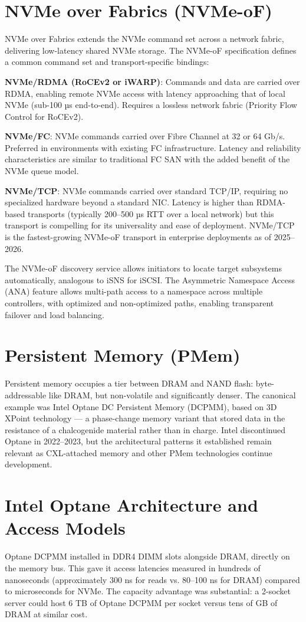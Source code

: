 \section{NVMe over Fabrics (NVMe-oF)}
NVMe over Fabrics extends the NVMe command set across a network fabric, delivering low-latency shared NVMe storage. The NVMe-oF specification defines a common command set and transport-specific bindings:

\textbf{NVMe/RDMA (RoCEv2 or iWARP)}: Commands and data are carried over RDMA, enabling remote NVMe access with latency approaching that of local NVMe (sub-100 µs end-to-end). Requires a lossless network fabric (Priority Flow Control for RoCEv2).

\textbf{NVMe/FC}: NVMe commands carried over Fibre Channel at 32 or 64 Gb/s. Preferred in environments with existing FC infrastructure. Latency and reliability characteristics are similar to traditional FC SAN with the added benefit of the NVMe queue model.

\textbf{NVMe/TCP}: NVMe commands carried over standard TCP/IP, requiring no specialized hardware beyond a standard NIC. Latency is higher than RDMA-based transports (typically 200--500 µs RTT over a local network) but this transport is compelling for its universality and ease of deployment. NVMe/TCP is the fastest-growing NVMe-oF transport in enterprise deployments as of 2025--2026.

The NVMe-oF discovery service allows initiators to locate target subsystems automatically, analogous to iSNS for iSCSI. The Asymmetric Namespace Access (ANA) feature allows multi-path access to a namespace across multiple controllers, with optimized and non-optimized paths, enabling transparent failover and load balancing.

\section{Persistent Memory (PMem)}
Persistent memory occupies a tier between DRAM and NAND flash: byte-addressable like DRAM, but non-volatile and significantly denser. The canonical example was Intel Optane DC Persistent Memory (DCPMM), based on 3D XPoint technology --- a phase-change memory variant that stored data in the resistance of a chalcogenide material rather than in charge. Intel discontinued Optane in 2022--2023, but the architectural patterns it established remain relevant as CXL-attached memory and other PMem technologies continue development.

\section{Intel Optane Architecture and Access Models}
Optane DCPMM installed in DDR4 DIMM slots alongside DRAM, directly on the memory bus. This gave it access latencies measured in hundreds of nanoseconds (approximately 300 ns for reads vs. 80--100 ns for DRAM) compared to microseconds for NVMe. The capacity advantage was substantial: a 2-socket server could host 6 TB of Optane DCPMM per socket versus tens of GB of DRAM at similar cost.

